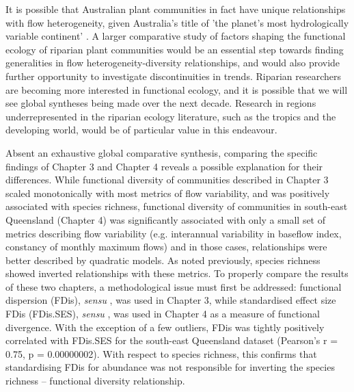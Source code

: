 \documentclass[openright,12pt,a4paper]{memoir}
\begin{document}
{{It is possible that Australian plant communities in fact have unique relationships with flow heterogeneity, given Australia's title of 'the planet’s most hydrologically variable continent' \citep{Peel2004, Rustomji2009}. A larger comparative study of factors shaping the functional ecology of riparian plant communities would be an essential step towards finding generalities in flow heterogeneity-diversity relationships, and would also provide further opportunity to investigate discontinuities in trends. Riparian researchers are becoming more interested in functional ecology, and it is possible that we will see global syntheses being made over the next decade. Research in regions underrepresented in the riparian ecology literature, such as the tropics and the developing world, would be of particular value in this endeavour.

Absent an exhaustive global comparative synthesis, comparing the specific findings of Chapter 3 and Chapter 4 reveals a possible explanation for their differences. While functional diversity of communities described in Chapter 3 scaled monotonically with most metrics of flow variability, and was positively associated with species richness, functional diversity of communities in south-east Queensland (Chapter 4) was significantly associated with only a small set of metrics describing flow variability (e.g. interannual variability in baseflow index, constancy of monthly maximum flows) and in those cases, relationships were better described by quadratic models. As noted previously, species richness showed inverted relationships with these metrics. To properly compare the results of these two chapters, a methodological issue must first be addressed: functional dispersion (FDis), \textit{sensu} \citet{Laliberte2010}, was used in Chapter 3, while standardised effect size FDis (FDis.SES), \textit{sensu} \citet{Mason2013}, was used in Chapter 4 as a measure of functional divergence. With the exception of a few outliers, FDis was tightly positively correlated with FDis.SES for the south-east Queensland dataset (Pearson's r = 0.75, p = 0.00000002). With respect to species richness, this confirms that standardising FDis for abundance was not responsible for inverting the species richness – functional diversity relationship.

}}
\end{document}

